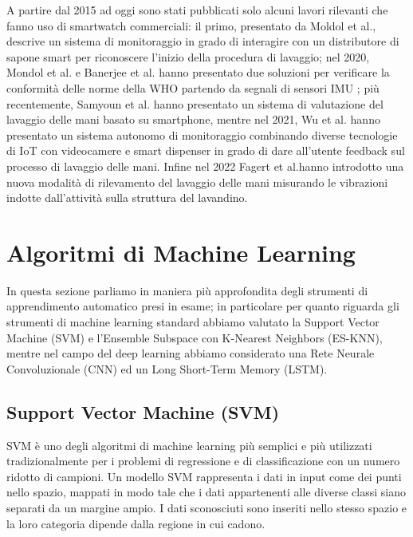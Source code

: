 A partire dal 2015 ad oggi sono stati pubblicati solo alcuni lavori rilevanti che fanno uso di smartwatch commerciali: il primo, presentato da Moldol et al., descrive un sistema di monitoraggio in grado di interagire con un distributore di sapone smart per riconoscere l'inizio della procedura di lavaggio\cite{mondol2015harmony}; nel 2020, Mondol et al. e Banerjee et al. hanno presentato due soluzioni per verificare la conformità delle norme della WHO partendo da segnali di sensori IMU \cite{mondol2020hawad}\cite{banerjee2020hand}; più recentemente, Samyoun et al. hanno presentato un sistema di valutazione del lavaggio delle mani basato su smartphone\cite{samyoun2021iwash}, mentre nel 2021, Wu et al. hanno presentato un sistema autonomo di monitoraggio combinando diverse tecnologie di IoT con videocamere e smart dispenser in grado di dare all'utente feedback sul processo di lavaggio delle mani. Infine nel 2022 Fagert et al.hanno introdotto una nuova modalità di rilevamento del lavaggio delle mani misurando le vibrazioni indotte dall'attività sulla struttura del lavandino\cite{fagert2022clean}.

\section{Algoritmi di Machine Learning}
\label{sec:ml-algorithms}

In questa sezione parliamo in maniera più approfondita degli strumenti di apprendimento automatico presi in esame; in particolare per quanto riguarda gli strumenti di machine learning standard abbiamo valutato la Support Vector Machine (SVM) e l'Ensemble Subspace con K-Nearest Neighbors (ES-KNN), mentre nel campo del deep learning abbiamo considerato una Rete Neurale Convoluzionale (CNN) ed un Long Short-Term Memory (LSTM).

\subsection{Support Vector Machine (SVM)}
\label{ssec:svm}

SVM è uno degli algoritmi di machine learning più semplici e più utilizzati tradizionalmente per i problemi di regressione e di classificazione con un numero ridotto di campioni.
Un modello SVM rappresenta i dati in input come dei punti nello spazio, mappati in modo tale che i dati appartenenti alle diverse classi siano separati da un margine ampio. I dati sconosciuti sono inseriti nello stesso spazio e la loro categoria dipende dalla regione in cui cadono.

